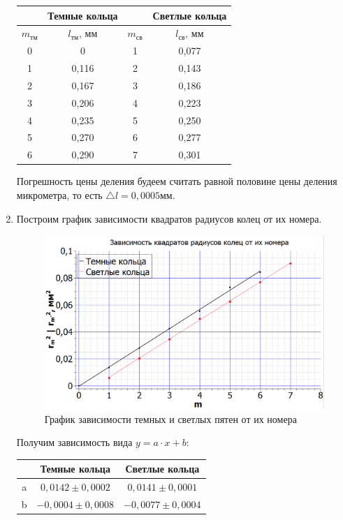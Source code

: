 \documentclass[a4paper, 12pt]{article}%
\begin{document}
\begin{enumerate}
\begin{center}
\begin{tabular}{|c|c|c|c|}
\hline 
 & Темные кольца & & Светлые кольца \\ 
\hline 
$m_{\text{тм}}$ & $l_{\text{тм}}$, мм &$m_{\text{св}}$ & $l_{\text{св}}$, мм \\ 
\hline 
0 & 0 & 1 & 0,077 \\ 
\hline 
1 & 0,116 & 2 & 0,143 \\ 
\hline 
2 & 0,167 & 3 & 0,186 \\ 
\hline 
3 & 0,206 & 4 & 0,223 \\ 
\hline 
4 & 0,235 & 5 & 0,250 \\ 
\hline 
5 & 0,270 & 6 & 0,277 \\ 
\hline 
6 & 0,290 & 7 & 0,301 \\ 
\hline 
\end{tabular} 
\end{center}

Погрешность цены деления будеем считать равной половине цены деления микрометра, то есть $\bigtriangleup l = 0,0005 \text{мм}$.

\item Построим график зависимости квадратов радиусов колец от их номера.

\begin{figure}[h!]
\centering
\includegraphics[scale=0.5]{images/graph_1.png}
\caption{График зависимости темных и светлых пятен от их номера}
\label{graph_1}
\end{figure}

Получим зависимость вида $y = a\cdot x + b$:

\begin{center}
\begin{tabular}{|c|c|c|}
\hline 
 & Темные кольца & Светлые кольца \\ 
\hline 
a & $0,0142\pm 0,0002$ & $0,0141\pm 0,0001$\\ 
\hline 
b & $-0,0004\pm 0,0008$ & $-0,0077\pm 0,0004$ \\ 
\hline 
\end{tabular} 
\end{center}


\end{enumerate}
\end{document}

